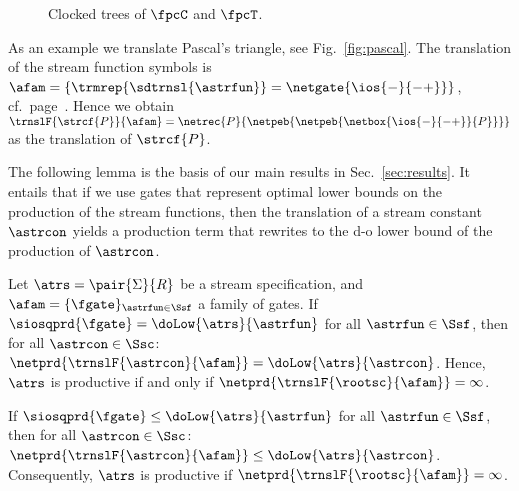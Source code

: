 \begin{figure}[h!]
  \begin{center}
  \caption{Clocked \bohm{} trees of $\boldsymbol{\fpcC}$ and $\boldsymbol{\fpcT}$.}
  \label{fig:boem:y0:y1}
  \end{center}
\end{figure}

\begin{example}
  As an example we translate Pascal's triangle, see Fig.~\ref{fig:pascal}.
  The translation of the stream function symbols is
  $\afam = \{\trmrep{\sdtrnsl{\astrfun}} = \netgate{\ios{-}{-+}}\}$,
  cf.\ page~\pageref{trans:Pascal:f}.
  Hence we obtain
  $\trnslF{\strcf{P}}{\afam} = \netrec{P}{\netpeb{\netpeb{\netbox{\ios{-}{-+}}{P}}}}$
  as the translation of $\strcf{P}$.
\end{example}

The following lemma is the basis of our main results in Sec.~\ref{sec:results}.
It entails that if we use gates that represent \daobly{} optimal lower bounds 
on the production of the stream functions,
then the translation of a stream constant $\astrcon$ 
yields a production term that rewrites to the d-o lower bound of the production of $\astrcon$.
%
\begin{lemma}\label{lem:outsourcing}
  Let $\atrs = \pair{\Sigma}{R}$ be a stream specification, and
  $\afam = \{\fgate\}_{\astrfun\in\Ssf}$ a family of gates.
  If $\siosqprd{\fgate} = \doLow{\atrs}{\astrfun}$ for all\/ $\astrfun \in \Ssf$,
  then for all\/ $\astrcon\in\Ssc$:
  $\netprd{\trnslF{\astrcon}{\afam}} = \doLow{\atrs}{\astrcon} $.
  Hence, $\atrs$ is \daobly{} productive
  if and only if\/ $\netprd{\trnslF{\rootsc}{\afam}} = \infty$.

  If $\siosqprd{\fgate} \le \doLow{\atrs}{\astrfun}$ for all\/ $\astrfun \in \Ssf$,
  then for all\/ $\astrcon\in\Ssc$:
  $\netprd{\trnslF{\astrcon}{\afam}} \le \doLow{\atrs}{\astrcon} $.
  Consequently, $\atrs$ is \daobly{} productive
  if\/ $\netprd{\trnslF{\rootsc}{\afam}} = \infty$.
\end{lemma}
